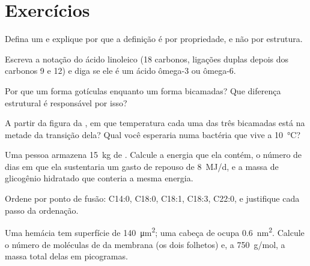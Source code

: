 \section{Exercícios}

\begin{exercise}[$\star$]\label{exo:b1:lipids:1}
Defina um  e explique por que a definição é por propriedade, e
não por estrutura.
\end{exercise}

\begin{exercise}[$\star$]\label{exo:b1:lipids:2}
Escreva a notação do ácido linoleico (18 carbonos, ligações duplas
depois dos carbonos 9 e 12) e diga se ele é um ácido ômega-3 ou ômega-6.
\end{exercise}

\begin{exercise}[$\star$]\label{exo:b1:lipids:3}
Por que um  forma gotículas enquanto um  forma
bicamadas? Que diferença estrutural é responsável por isso?
\end{exercise}

\begin{exercise}[$\star$]\label{exo:b1:lipids:4}
A partir da figura da , em que temperatura cada uma das três
bicamadas está na metade da transição dela? Qual você esperaria numa
bactéria que vive a \qty{10}{\celsius}?
\end{exercise}

\begin{exercise}[$\star\star$]\label{exo:b1:lipids:5}
Uma pessoa armazena \qty{15}{kg} de . Calcule a energia que ela
contém, o número de dias em que ela sustentaria um gasto de repouso de
\qty{8}{MJ/d}, e a massa de glicogênio hidratado que conteria a mesma
energia.
\end{exercise}

\begin{exercise}[$\star\star$]\label{exo:b1:lipids:6}
Ordene por ponto de fusão: C14:0, C18:0, C18:1, C18:3, C22:0, e
justifique cada passo da ordenação.
\end{exercise}

\begin{exercise}[$\star\star$]\label{exo:b1:lipids:7}
Uma hemácia tem superfície de \qty{140}{\micro m^2}; uma cabeça de
 ocupa \qty{0.6}{nm^2}. Calcule o número de moléculas de
 da membrana (os dois folhetos) e, a \qty{750}{g/mol}, a
massa total delas em picogramas.
\end{exercise}

